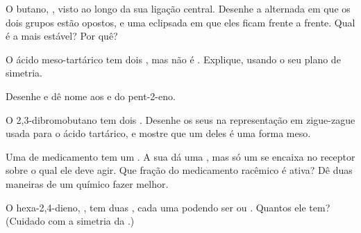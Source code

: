 \begin{exercise}[$\star\star$]\label{exo:g12:stereochemistry:9}
O butano, , visto ao longo da sua ligação central.
Desenhe a  alternada em que os dois grupos  estão
opostos, e uma eclipsada em que eles ficam frente a frente. Qual é a
mais estável? Por quê?
\end{exercise}

\begin{exercise}[$\star\star$]\label{exo:g12:stereochemistry:10}
O ácido meso-tartárico tem dois , mas não é .
Explique, usando o seu plano de simetria.
\end{exercise}

\begin{exercise}[$\star\star$]\label{exo:g12:stereochemistry:11}
Desenhe e dê nome aos  e  do pent-2-eno.
\end{exercise}

\begin{exercise}[$\star\star\star$]\label{exo:g12:stereochemistry:12}
O 2,3-dibromobutano  tem dois . Desenhe os seus  na representação em
zigue-zague usada para o ácido tartárico, e mostre que um deles é uma
forma meso.
\end{exercise}

\begin{exercise}[$\star\star\star$]\label{exo:g12:stereochemistry:13}
Uma  de medicamento tem um . A sua  dá
uma , mas só um  se encaixa no receptor
 sobre o qual ele deve agir. Que fração do medicamento racêmico é
ativa? Dê duas maneiras de um químico fazer melhor.
\end{exercise}

\begin{exercise}[$\star\star\star$]\label{exo:g12:stereochemistry:14}
O hexa-2,4-dieno, , tem duas ,
cada uma podendo ser  ou . Quantos  ele tem? (Cuidado
com a simetria da .)
\end{exercise}

